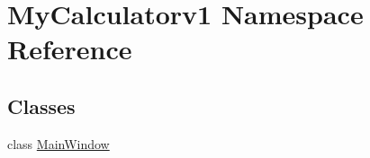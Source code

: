 \hypertarget{namespace_my_calculatorv1}{}\section{My\+Calculatorv1 Namespace Reference}
\label{namespace_my_calculatorv1}
\subsection*{Classes}
\begin{DoxyCompactItemize}
\item 
class \mbox{\hyperlink{class_my_calculatorv1_1_1_main_window}{Main\+Window}}
\end{DoxyCompactItemize}
